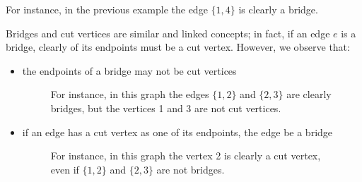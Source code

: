 \documentclass[a4paper, 12pt]{report}
\begin{document}
    For instance, in the previous example the edge $\{1,4\}$ is clearly a bridge.

    Bridges and cut vertices are similar and linked concepts; in fact, if an edge $e$ is a bridge, clearly  of its endpoints must be a cut vertex. However, we observe that:

    \begin{itemize}
        \item the endpoints of a bridge may not be  cut vertices

            \begin{figure}[H]
                \centering
                \caption{For instance, in this graph the edges $\{1, 2\}$ and $\{2, 3\}$ are clearly bridges, but the vertices 1 and 3 are not cut vertices.}
            \end{figure}

        \item if an edge has a cut vertex as one of its endpoints, the edge  be a bridge

            \begin{figure}[H]
                \centering
                \caption{For instance, in this graph the vertex 2 is clearly a cut vertex, even if $\{1, 2\}$ and $\{2, 3\}$ are not bridges.}
            \end{figure}
    \end{itemize}
\end{document}
